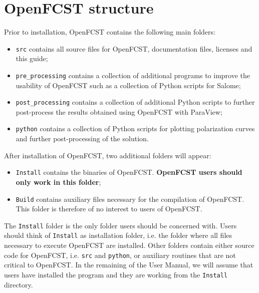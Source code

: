 \chapter{OpenFCST structure}

Prior to installation, OpenFCST contains the following main folders:
\begin{itemize}
 \item \texttt{src} contains all source files for OpenFCST, documentation files, licenses and this guide;
 \item \texttt{pre\_processing} contains a collection of additional programs to improve the usability of OpenFCST such as a collection of Python scripts for Salome;
 \item \texttt{post\_processing} contains a collection of additional Python scripts to further post-process the results obtained using OpenFCST with ParaView; 
 \item \texttt{python} contains a collection of Python scripts for plotting polarization curves and further post-processing of the solution.
\end{itemize}

After installation of OpenFCST, two additional folders will appear:
\begin{itemize}
 \item \texttt{Install} contains the binaries of OpenFCST. \textbf{OpenFCST users should only work in this folder};
 \item \texttt{Build} contains auxiliary files necessary for the compilation of OpenFCST. This folder is therefore of no interest to users of OpenFCST.
\end{itemize}

The \texttt{Install} folder is the only folder users should be concerned with. Users should think of \texttt{Install} as installation folder, i.e. the folder where all files necessary to execute OpenFCST are installed. Other folders contain either source code for OpenFCST, i.e. \texttt{src} and \texttt{python}, or auxiliary routines that are not critical to OpenFCST. In the remaining of the User Manual, we will assume that users have installed the program and they are working from the \texttt{Install} directory.

